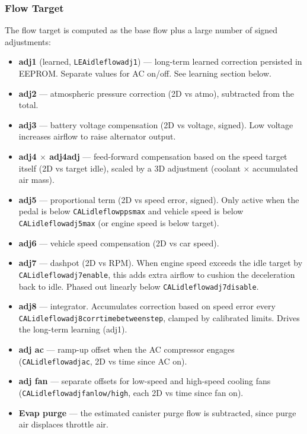 \documentclass[a4paper,11pt]{article}
\renewcommand{\_}{\oldunderscore\allowbreak}
\begin{document}
\subsubsection*{Flow Target}

The flow target is computed as the base flow plus a large number of
signed adjustments:
\begin{itemize}
\item \textbf{adj1} (learned, \texttt{LEA\_idle\_flow\_adj1}) --- long-term
      learned correction persisted in EEPROM. Separate values for AC
      on/off. See learning section below.
\item \textbf{adj2} --- atmospheric pressure correction (2D vs atmo),
      subtracted from the total.
\item \textbf{adj3} --- battery voltage compensation (2D vs voltage, signed).
      Low voltage increases airflow to raise alternator output.
\item \textbf{adj4 $\times$ adj4\_adj} --- feed-forward compensation based on
      the speed target itself (2D vs target idle), scaled by a 3D adjustment
      (coolant $\times$ accumulated air mass).
\item \textbf{adj5} --- proportional term (2D vs speed error, signed). Only
      active when the pedal is below \texttt{CAL\_idle\_flow\_pps\_max}
      and vehicle speed is below \texttt{CAL\_idle\_flow\_adj5\_max}
      (or engine speed is below target).
\item \textbf{adj6} --- vehicle speed compensation (2D vs car speed).
\item \textbf{adj7} --- dashpot (2D vs RPM). When engine speed
      exceeds the idle target by \texttt{CAL\_idle\_flow\_adj7\_enable},
      this adds extra airflow to cushion the deceleration back to idle. Phased
      out linearly below \texttt{CAL\_idle\_flow\_adj7\_disable}.
\item \textbf{adj8} --- integrator. Accumulates correction based on speed
      error every \texttt{CAL\_idle\_flow\_adj8\_corr\_time\_between\_step},
      clamped by calibrated limits. Drives the long-term learning (adj1).
\item \textbf{adj ac} --- ramp-up offset when the AC compressor engages
      (\texttt{CAL\_idle\_flow\_adj\_ac}, 2D vs time since AC on).
\item \textbf{adj fan} --- separate offsets for low-speed and
      high-speed cooling fans
      (\texttt{CAL\_idle\_flow\_adj\_fan\_low/high}, each 2D vs time since
      fan on).
\item \textbf{Evap purge} --- the estimated canister purge flow is subtracted,
      since purge air displaces throttle air.
\end{itemize}
\end{document}

